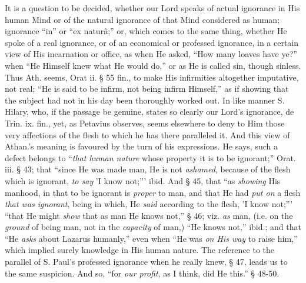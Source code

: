 It is a question to be decided, whether our Lord
speaks of actual ignorance in His human Mind or of the natural
ignorance of that Mind considered as human; ignorance ``in'' or ``ex
naturâ;'' or, which comes to the same thing, whether He spoke
of a real ignorance, or of an economical or professed ignorance, in a
certain view of His incarnation or office, as when He asked, ``How
many loaves have ye?'' when ``He Himself knew what He would do,''
or as He is called sin, though sinless. Thus Ath. seems, Orat ii. §
55 fin., to make His infirmities altogether imputative, not real; ``He is said to be infirm, not being infirm Himself,'' as if showing
that the subject had not in his day been thoroughly worked out. In
like manner S. Hilary, who, if the passage be genuine, states so
clearly our Lord's ignorance, de Trin. ix. fin., yet, as Petavius
observes, seems elsewhere to deny to Him those very affections of the
flesh to which he has there paralleled it. And this view of Athan.'s
meaning is favoured by the turn of his expressions. He says, such a
defect belongs to ``\emph{that human nature} whose property it
is to be ignorant;'' Orat. iii. § 43; that ``since He was made man,
He is not \emph{ashamed}, because of the flesh which is ignorant, \emph{to
say} 'I know not;''' ibid. And § 45, that ``as \emph{showing}
His manhood, in that to be ignorant is \emph{proper} to man, and that
He had \emph{put on} a flesh \emph{that was ignorant}, being in which,
He \emph{said} according to the flesh, 'I know not;''' ``that He
might \emph{show} that as man He knows not,'' § 46; viz. \emph{as}
man, (i.e. on the \emph{ground} of being man, not in the \emph{capacity}
of man,) ``He knows not,'' ibid.; and that ``He \emph{asks} about
Lazarus humanly,'' even when ``He was \emph{on His way} to raise
him,'' which implied surely knowledge in His human nature. The
reference to the parallel of S. Paul's professed ignorance when he
really knew, § 47, leads us to the same suspicion. And so, ``for \emph{our
profit}, as I think, did He this.'' § 48-50.

